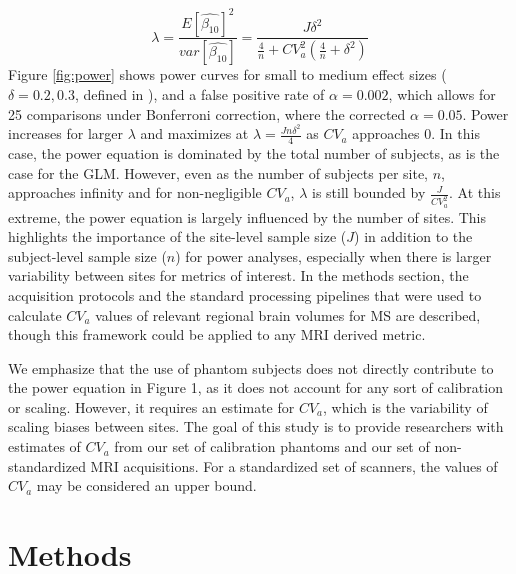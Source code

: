 \documentclass{article}
\begin{document}
\begin{equation}
\label{eq:lambda}
\lambda = \frac{E[\hat{\beta_{10}}]^2}{{var}[\hat{\beta_{10}}]} = \frac{J\delta^2}{\frac{4}{n}+CV_{a}^2(\frac{4}{n} + \delta^2)}
\end{equation}
Figure \ref{fig:power} shows power curves for small to medium effect sizes ($\delta = 0.2, 0.3$, defined in \cite{Raudenbush2000}), and a false positive rate of $\alpha = 0.002$, which allows for 25 comparisons under Bonferroni correction, where the corrected $\alpha = 0.05$. Power increases for larger $\lambda$  and maximizes at $\lambda = \frac{Jn\delta^2}{4}$ as $CV_a$ approaches 0. In this case, the power equation is dominated by the total number of subjects, as is the case for the GLM. However, even as the number of subjects per site, $n$, approaches infinity and for non-negligible $CV_a$, $\lambda$ is still bounded by $\frac{J}{CV_a^2}$. At this extreme, the  power equation is largely influenced by the number of sites. This highlights the importance of the site-level sample size ($J$) in addition to the subject-level sample size ($n$) for power analyses, especially when there is larger variability between sites for metrics of interest. In the methods section, the acquisition protocols and the standard processing pipelines that were used to calculate $CV_a$ values of relevant regional brain volumes for MS are described, though this framework could be applied to any MRI derived metric.

We emphasize that the use of phantom subjects does not directly contribute to the power equation in Figure 1, as it does not account for any sort of calibration or scaling. However, it requires an estimate for $CV_a$, which is the variability of scaling biases between sites. The goal of this study is to provide researchers with estimates of $CV_a$ from our set of calibration phantoms and our set of non-standardized MRI acquisitions. For a standardized set of scanners, the values of $CV_a$ may be considered an upper bound. 
\section{Methods}
\end{document}
